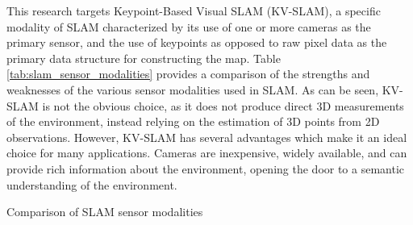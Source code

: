 This research targets Keypoint-Based Visual SLAM (KV-SLAM), a specific modality of SLAM characterized by its use of one or more cameras as the primary sensor, and the use of keypoints as opposed to raw pixel data as the primary data structure for constructing the map. Table \ref{tab:slam_sensor_modalities} provides a comparison of the strengths and weaknesses of the various sensor modalities used in SLAM. As can be seen, KV-SLAM is not the obvious choice, as it does not produce direct 3D measurements of the environment, instead relying on the estimation of 3D points from 2D observations. However, KV-SLAM has several advantages which make it an ideal choice for many applications. Cameras are inexpensive, widely available, and can provide rich information about the environment, opening the door to a semantic understanding of the environment.

\begin{table}[ht!]
    \centering
    \caption{Comparison of SLAM sensor modalities}
    \label{tab:slam_sensor_modalities}
\end{table}